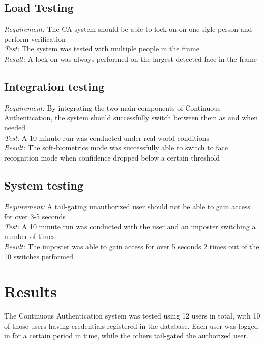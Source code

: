 \documentclass[12pt]{article}			%
\begin{document}
\subsection{ Load Testing }
\emph{ Requirement: } The CA system should be able to lock-on on one sigle person and perform verification \\
\emph{ Test: } The system was tested with multiple people in the frame\\
\emph{ Result: } A lock-on was always performed on the largest-detected face in the frame\\

\subsection{ Integration testing}
\emph{ Requirement: } By integrating the two main components of Continuous Authentication, the system should successfully switch between them as and when needed\\
\emph{ Test: } A 10 minute run was conducted under real-world conditions\\
\emph{ Result: } The soft-biometrics mode was successfully able to switch to face recognition mode when confidence dropped below a certain threshold\\

\subsection{ System testing }
\emph{ Requirement: } A tail-gating unauthorized user should not be able to gain access for over 3-5 seconds\\
\emph{ Test: } A 10 minute run was conducted with the user and an imposter switching a number of times\\
\emph{ Result: } The imposter was able to gain access for over 5 seconds 2 times out of the 10 switches performed\\

\section{ Results }
The Continuous Authentication system was tested using 12 users in total, with 10 of those users having credentials registered in the database. Each user was logged in for a certain period in time, while the others tail-gated the authorized user. 
\end{document}
